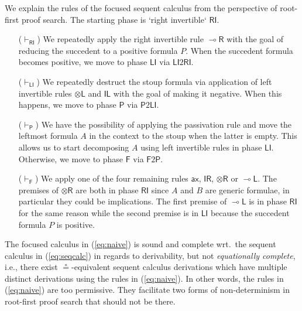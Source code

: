 \documentclass[copyright,creativecommons]{eptcs}
\theoremstyle{definition}
\newcommand{\tl}{\otimes \mathsf{L}}
\newcommand{\tr}{\otimes \mathsf{R}}
\newcommand{\lright}{{\multimap}\mathsf{R}}
\newcommand{\lleft}{{\multimap}\mathsf{L}}
\newcommand{\unitl}{\mathsf{IL}}
\newcommand{\unitr}{\mathsf{IR}}
\newcommand{\ax}{\mathsf{ax}}
\newcommand{\RI}{\mathsf{RI}}
\newcommand{\LI}{\mathsf{LI}}
\newcommand{\Pass}{\mathsf{P}}
\newcommand{\F}{\mathsf{F}}
\begin{document}
We explain the rules of the focused sequent calculus from the perspective of root-first proof search. The starting phase is `right invertible` $\RI$. 
\begin{itemize}
\item[($\vdash_\RI$)] We repeatedly apply the right invertible rule $\lright$ with the goal of reducing the succedent to a positive formula $P$.
  When the succedent formula becomes positive, we move to phase $\LI$ via $\LI2\RI$.
\item[($\vdash_\LI$)] We repeatedly destruct the stoup formula via application of left invertible rules $\tl$ and $\unitl$ with the goal of making it negative. When this happens, we move to phase $\Pass$ via $\Pass2\LI$.
\item[($\vdash_\Pass$)] We have the possibility of applying the passivation rule and move the leftmost formula $A$ in the context to the stoup when the latter is empty. This allows us to start decomposing $A$ using left invertible rules in phase $\LI$. Otherwise, we move to phase $\F$ via $\F2\Pass$.
\item[($\vdash_\F$)] We apply one of the four remaining rules $\ax$, $\unitr$, $\tr$ or $\lleft$. The premises of $\tr$ are both in phase $\RI$ since $A$ and $B$ are generic formulae, in particular they could be implications. The first premise of $\lleft$ is in phase $\RI$ for the same reason while the second premise is in $\LI$ because the succedent formula $P$ is positive.
\end{itemize}

The focused calculus in (\ref{eq:naive}) is sound and complete wrt.\ the sequent calculus in (\ref{eq:seqcalc}) in regards to derivability, but not \emph{equationally complete}, i.e., there exist $\circeq$-equivalent sequent calculus derivations which have multiple distinct derivations using the rules in (\ref{eq:naive}). In other words, the rules in (\ref{eq:naive}) are too permissive. They facilitate two forms of non-determinism in root-first proof search that should not be there.
\end{document}
